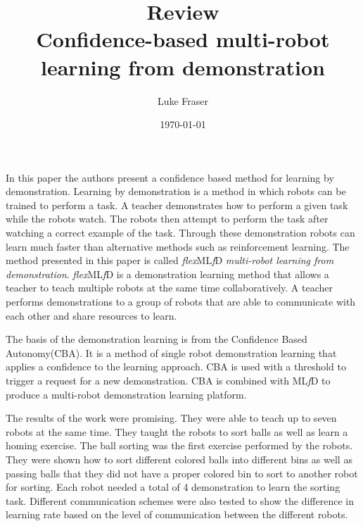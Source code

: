 \documentclass{article}
\begin{document}
\title{{\large Review} \\ Confidence-based multi-robot learning from demonstration}
\author{Luke Fraser}
\date{\today}
\maketitle

\begingroup
\renewcommand{\section}[2]{}


\endgroup

\section*{Summary}
In this paper the authors present a confidence based method for learning by demonstration. Learning by demonstration is a method in which robots can be trained to perform a task. A teacher demonstrates how to perform a given task while the robots watch. The robots then attempt to perform the task after watching a correct example of the task. Through these demonstration robots can learn much faster than alternative methods such as reinforcement learning. The method presented in this paper is called \emph{flex}ML\emph{f}D \emph{multi-robot learning from demonstration}. \emph{flex}ML\emph{f}D is a demonstration learning method that allows a teacher to teach multiple robots at the same time collaboratively. A teacher performs demonstrations to a group of robots that are able to communicate with each other and share resources to learn.

The basis of the demonstration learning is from the Confidence Based Autonomy(CBA). It is a method of single robot demonstration learning that applies a confidence to the learning approach. CBA is used with a threshold to trigger a request for a new demonstration. CBA is combined with ML\emph{f}D to produce a multi-robot demonstration learning platform.

The results of the work were promising. They were able to teach up to seven robots at the same time. They taught the robots to sort balls as well as learn a homing exercise. The ball sorting was the first exercise performed by the robots. They were shown how to sort different colored balls into different bins as well as passing balls that they did not have a proper colored bin to sort to another robot for sorting. Each robot needed a total of 4 demonstration to learn the sorting task. Different communication schemes were also tested to show the difference in learning rate based on the level of communication between the different robots.
\end{document}
